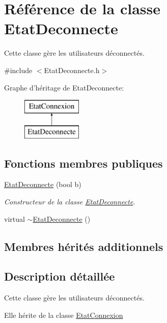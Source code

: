 \hypertarget{class_etat_deconnecte}{\section{Référence de la classe Etat\-Deconnecte}
\label{class_etat_deconnecte}
}


Cette classe gère les utilisateurs déconnectés.  




{\ttfamily \#include $<$Etat\-Deconnecte.\-h$>$}

Graphe d'héritage de Etat\-Deconnecte\-:\begin{figure}[H]
\begin{center}
\leavevmode
\includegraphics[height=2.000000cm]{class_etat_deconnecte}
\end{center}
\end{figure}
\subsection*{Fonctions membres publiques}
\begin{DoxyCompactItemize}
\item 
\hyperlink{class_etat_deconnecte_add0d9bf610ab5ca451880beacd6f0490}{Etat\-Deconnecte} (bool b)
\begin{DoxyCompactList}\small\item\em Constructeur de la classe \hyperlink{class_etat_deconnecte}{Etat\-Deconnecte}. \end{DoxyCompactList}\item 
virtual \hyperlink{class_etat_deconnecte_ad281d0077116df015bc1149557042d95}{$\sim$\-Etat\-Deconnecte} ()
\end{DoxyCompactItemize}
\subsection*{Membres hérités additionnels}


\subsection{Description détaillée}
Cette classe gère les utilisateurs déconnectés. 

Elle hérite de la classe \hyperlink{class_etat_connexion}{Etat\-Connexion} 

